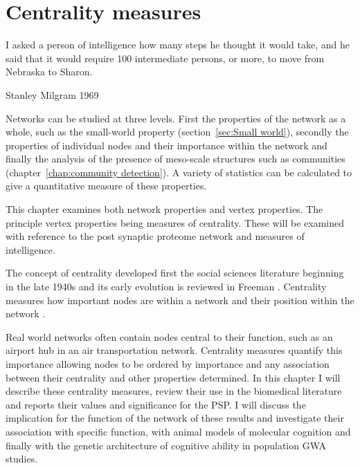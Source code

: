 \chapter{Centrality measures}




 \begin{displayquote}
 I asked a person of intelligence how many steps he thought it would take, and he said that it would require 100 intermediate persons, or more, to move from Nebraska to Sharon. \cite{milgram1967small}
 
 Stanley Milgram 1969
\end{displayquote}




 Networks can be studied at three levels. First the properties of the network as a whole, such as the small-world property (section~\ref{sec:Small world}), secondly the properties of individual nodes and their importance  within the network and finally the analysis of the presence of meso-scale structures such as communities (chapter~\ref{chap:community detection}). A variety of statistics can be calculated to give a quantitative measure of these properties.

This chapter examines both network properties and vertex properties. The principle vertex properties being measures of centrality. These will be examined with reference to the post synaptic proteome network and measures of intelligence.

 The concept of centrality developed first the social sciences literature beginning in the late 1940s and its early evolution is reviewed in Freeman \cite{freeman1978centrality}. Centrality measures how important nodes are within a network \cite{newman2018networks} and their position within the network \cite{freeman1978centrality}.


Real world networks often contain nodes central to their function, such as an airport hub in an air transportation network.\cite{borenstein1989hubs} Centrality measures quantify this importance allowing nodes to be ordered by importance and any association between their centrality and other properties determined. In this chapter I will describe these centrality measures, review their use in the biomedical literature and reports their values and significance for the PSP. I will discuss the implication for the function of the network of these results and investigate their association with specific function, with animal models of molecular cognition and finally with the genetic architecture of cognitive ability in population GWA studies.   

